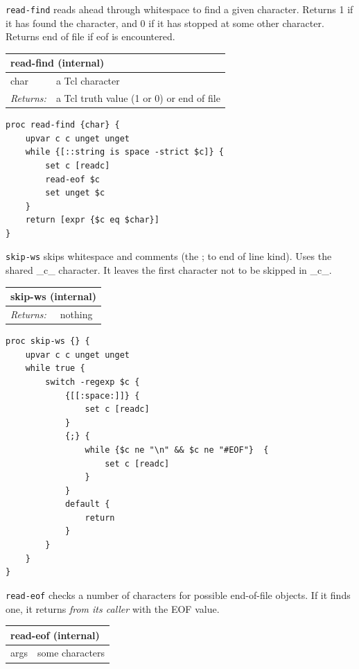 \documentclass[twoside,9pt]{report}
\begin{document}
\texttt{read-find} reads ahead through whitespace to find a given character. Returns 1 if it has found the character, and 0 if it has stopped at some other character. Returns end of file if eof is encountered.

\begin{tabular}{ |l l| }
\hline
\multicolumn{2}{|l|}{read-find (internal)} \\
\hline
char & a Tcl character \\
\textit{Returns:} & a Tcl truth value (1 or 0) or end of file \\
\hline
\end{tabular}

\noindent\makebox[\linewidth]{\rule{\linewidth}{0.4pt}}
\begin{lstlisting}
proc read-find {char} {
    upvar c c unget unget
    while {[::string is space -strict $c]} {
        set c [readc]
        read-eof $c
        set unget $c
    }
    return [expr {$c eq $char}]
}
\end{lstlisting}
\noindent\makebox[\linewidth]{\rule{\linewidth}{0.4pt}}

\texttt{skip-ws} skips whitespace and comments (the ; to end of line kind). Uses the shared \_c\_ character. It leaves the first character not to be skipped in \_c\_.

\begin{tabular}{ |l l| }
\hline
\multicolumn{2}{|l|}{skip-ws (internal)} \\
\hline
\textit{Returns:} & nothing \\
\hline
\end{tabular}

\noindent\makebox[\linewidth]{\rule{\linewidth}{0.4pt}}
\begin{lstlisting}
proc skip-ws {} {
    upvar c c unget unget
    while true {
        switch -regexp $c {
            {[[:space:]]} {
                set c [readc]
            }
            {;} {
                while {$c ne "\n" && $c ne "#EOF"}  {
                    set c [readc]
                }
            }
            default {
                return
            }
        }
    }
}
\end{lstlisting}
\noindent\makebox[\linewidth]{\rule{\linewidth}{0.4pt}}

\texttt{read-eof} checks a number of characters for possible end-of-file objects. If it finds one, it returns \emph{from its caller} with the EOF value.

\begin{tabular}{ |l l| }
\hline
\multicolumn{2}{|l|}{read-eof (internal)} \\
\hline
args & some characters \\
\hline
\end{tabular}
\end{document}

